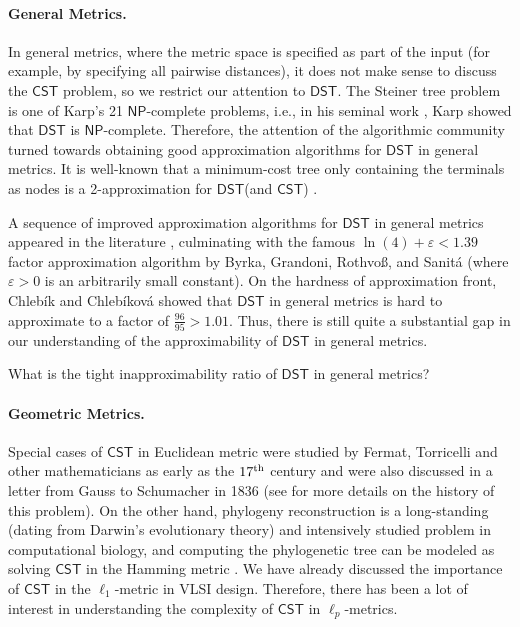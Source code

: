 \documentclass{article}\providecommand{\DeclareRedundantLanguages}[2]{}\usepackage[a4paper,margin=20mm]{geometry}
\newcommand{\1}{\textbf{1}}
\newcommand{\cst}{$\mathsf{CST}$\xspace}
\newcommand{\dst}{$\mathsf{DST}$\xspace}
\newcommand{\np}{$\mathsf{NP}$\xspace}
\begin{document}
\paragraph{General Metrics.}
  In general metrics, where the metric space is specified as part of the input (for example, by specifying all pairwise distances), it does not make sense to discuss the \cst problem, so we restrict our attention to \dst. The Steiner tree problem is one of Karp's 21 \np-complete problems, i.e., in his seminal work \cite{karp1972reducibility},  Karp showed that \dst is \np-complete. Therefore, the attention of the algorithmic community turned towards obtaining good approximation algorithms for \dst in general metrics. It is well-known that a minimum-cost
tree only containing the terminals as nodes is a 2-approximation for \dst (and \cst) \cite{Gilbert_Pollak_1968,Vazirani_2001}.

A sequence of improved approximation algorithms for \dst in general metrics appeared in the literature \cite{zelikovsky199311,karpinski1997new,promel2000new,robins2005tighter}, culminating with the famous $\ln(4)+\varepsilon<1.39$ factor approximation algorithm by Byrka, Grandoni, Rothvo{\ss}, and Sanit\'a \cite{byrka2013steiner} (where $\varepsilon>0$ is an arbitrarily small constant). On the hardness of approximation front, Chleb\'ik and Chleb\'ikov\'a \cite{Chlebik_Chlebikova_2008} showed that \dst in general metrics is hard to approximate to a factor of $\frac{96}{95}>1.01$. Thus, there is still quite a substantial gap in our understanding of the approximability of \dst in general metrics. 

 
\begin{openq}What is the tight inapproximability ratio of \dst in general metrics? \label{open1}\end{openq}

\paragraph{Geometric Metrics.}
Special cases of \cst in Euclidean metric were studied by Fermat, Torricelli and other mathematicians
as early as the $17\textsuperscript{th} $ 
century and were also discussed in a letter from  Gauss to Schumacher in 1836 (see \cite{brazil2014history} for more details on the history of this problem). 
On the other hand, phylogeny reconstruction  is a long-standing (dating from Darwin’s evolutionary theory) and
intensively studied problem in computational biology, and computing the phylogenetic
tree can be modeled as solving \cst in the Hamming metric \cite{foulds1982steiner}. We have already discussed the importance of \cst in the $\ell_1$-metric in VLSI design. Therefore, there has been a lot of interest in understanding the complexity of \cst in $\ell_p$-metrics.  
\end{document}
